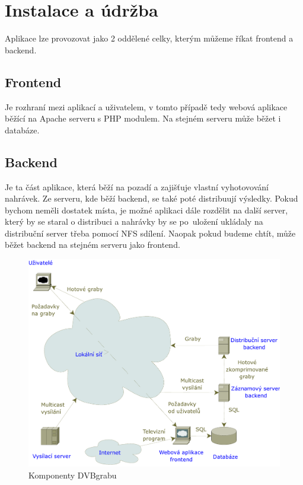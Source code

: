 \chapter{Instalace a údržba}
Aplikace lze provozovat jako 2 oddělené celky, kterým můžeme říkat frontend a backend.
\section{Frontend}
Je rozhraní mezi aplikací a uživatelem, v tomto případě tedy webová aplikace běžící na Apache serveru s PHP modulem. Na stejném serveru může běžet i databáze.
\section{Backend}
Je ta část aplikace, která běží na pozadí a zajišťuje vlastní vyhotovování nahrávek. Ze serveru, kde běží backend, se také poté distribuují výsledky. Pokud bychom neměli dostatek místa, je možné aplikaci dále rozdělit na další server, který by se staral o distribuci a nahrávky by se po~uložení ukládaly na distribuční server třeba pomocí NFS sdílení. Naopak pokud budeme chtít, může běžet backend na stejném serveru jako frontend.

\begin{figure}[ht]
\begin{center}
\includegraphics[width=15cm]{images/dvbgrab}
\caption{Komponenty DVBgrabu}
\label{fig:dvbgrab}
\end{center}
\end{figure}

